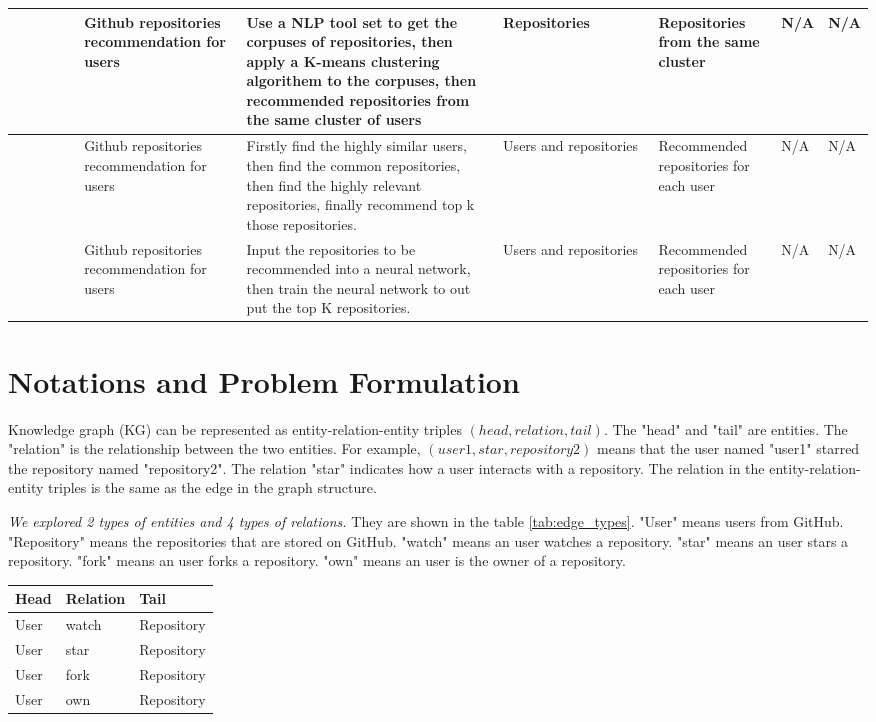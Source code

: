 \documentclass[11pt,twoside]{report}
\begin{document}
\begin{center}
\begin{longtable}{p{0.1\linewidth}p{0.2\linewidth}p{0.35\linewidth}p{0.2\linewidth}p{0.2\linewidth}p{0.05\linewidth}p{0.05\linewidth}}
    \hline
    \cite{portugal_gh4re_nodate} & Github repositories recommendation for users & Use a NLP tool set to get the corpuses of repositories, then apply a K-means clustering algorithem to the corpuses, then recommended repositories from the same cluster of users & Repositories & Repositories from the same cluster & N/A & N/A \\
    \hline
    \cite{guendouz_recommending_2015} & Github repositories recommendation for users & Firstly find the highly similar users, then find the common repositories, then find the highly relevant repositories, finally recommend top k those repositories. & Users and repositories & Recommended repositories for each user & N/A & N/A \\
    \hline
    \cite{liu_recommending_2018} & Github repositories recommendation for users & Input the repositories to be recommended into a neural network, then train the neural network to out put the top K repositories. & Users and repositories & Recommended repositories for each user & N/A & N/A \\
    \hline
    \end{longtable}
    \label{tab:literature_review_matrix}
\end{center}

\chapter{Notations and Problem Formulation}
Knowledge graph (KG) can be represented as entity-relation-entity triples $(head, relation, tail)$. The "head" and "tail" are entities. The "relation" is the relationship between the two entities. For example, $(user1, star, repository2)$ means that the user named "user1" starred the repository named "repository2". The relation "star" indicates how a user interacts with a repository. The relation in the entity-relation-entity triples is the same as the edge in the graph structure.

\textit{We explored 2 types of entities and 4 types of relations.} They are shown in the table \ref{tab:edge_types}. "User" means users from GitHub. "Repository" means the repositories that are stored on GitHub. "watch" means an user watches a repository. "star" means an user stars a repository. "fork" means an user forks a repository. "own" means an user is the owner of a repository. 

\begin{center}
    \begin{tabular}{l | l | l}
    \hline
    Head & Relation & Tail \\
    \hline
    User & watch & Repository \\
    User & star & Repository \\
    User & fork & Repository \\
    User & own & Repository \\
    \end{tabular}
    \label{tab:edge_types}
\end{center}
\end{document}
